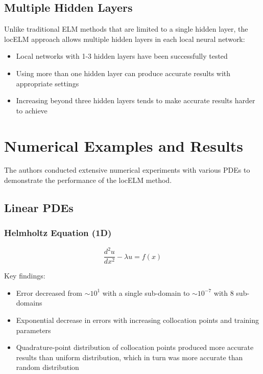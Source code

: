 \documentclass[11pt,a4paper]{article}
\begin{document}
\subsection{Multiple Hidden Layers}
Unlike traditional ELM methods that are limited to a single hidden layer, the locELM approach allows multiple hidden layers in each local neural network:

\begin{itemize}
    \item Local networks with 1-3 hidden layers have been successfully tested
    \item Using more than one hidden layer can produce accurate results with appropriate settings
    \item Increasing beyond three hidden layers tends to make accurate results harder to achieve
\end{itemize}

\section{Numerical Examples and Results}

The authors conducted extensive numerical experiments with various PDEs to demonstrate the performance of the locELM method.

\subsection{Linear PDEs}

\subsubsection{Helmholtz Equation (1D)}
\begin{equation}
    \frac{d^2u}{dx^2} - \lambda u = f(x)
\end{equation}

Key findings:
\begin{itemize}
    \item Error decreased from $\sim 10^1$ with a single sub-domain to $\sim 10^{-7}$ with 8 sub-domains
    \item Exponential decrease in errors with increasing collocation points and training parameters
    \item Quadrature-point distribution of collocation points produced more accurate results than uniform distribution, which in turn was more accurate than random distribution
\end{itemize}
\end{document}
